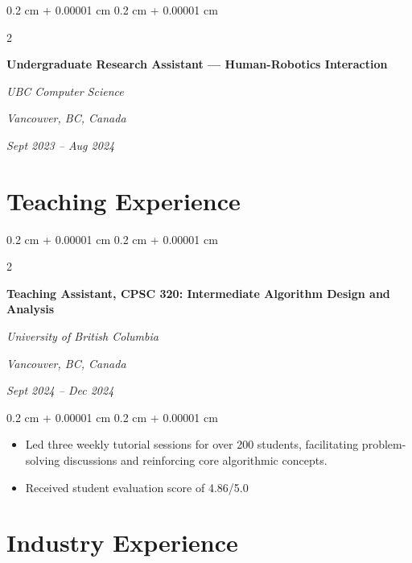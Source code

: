 \documentclass[10pt, letterpaper]{article}
\newenvironment{highlights}{
    \begin{itemize}[
        topsep=0.10 cm,
        parsep=0.10 cm,
        partopsep=0pt,
        itemsep=0pt,
        leftmargin=0.4 cm + 10pt
    ]
}{
    \end{itemize}
} %
\newenvironment{onecolentry}{
    \begin{adjustwidth}{
        0.2 cm + 0.00001 cm
    }{
        0.2 cm + 0.00001 cm
    }
}{
    \end{adjustwidth}
} %
\newenvironment{twocolentry}[2][]{
    \onecolentry
    \def\secondColumn{#2}
    \setcolumnwidth{\fill, 4.5 cm}
    \begin{paracol}{2}
}{
    \switchcolumn \raggedleft \secondColumn
    \end{paracol}
    \endonecolentry
} %
\begin{document}
        \vspace{0.2 cm}

        \begin{twocolentry}{
        \textit{Vancouver, BC, Canada}    
            
        \textit{Sept 2023 – Aug 2024}}
            \textbf{Undergraduate Research Assistant — Human-Robotics Interaction}
            
            \textit{UBC Computer Science}

        \end{twocolentry}




    
    \section{Teaching Experience}



        
        \begin{twocolentry}{
        \textit{Vancouver, BC, Canada}    
            
        \textit{Sept 2024 – Dec 2024}}
            \textbf{Teaching Assistant, CPSC 320: Intermediate Algorithm Design and Analysis}
            
            \textit{University of British Columbia}

        \end{twocolentry}

        \vspace{0.10 cm}
        \begin{onecolentry}
            \begin{highlights}
                \item Led three weekly tutorial sessions for over 200 students, facilitating problem-solving discussions and reinforcing core algorithmic concepts.
                \item Received student evaluation score of 4.86/5.0
            \end{highlights}
        \end{onecolentry}



    
    \section{Industry Experience}
\end{document}
